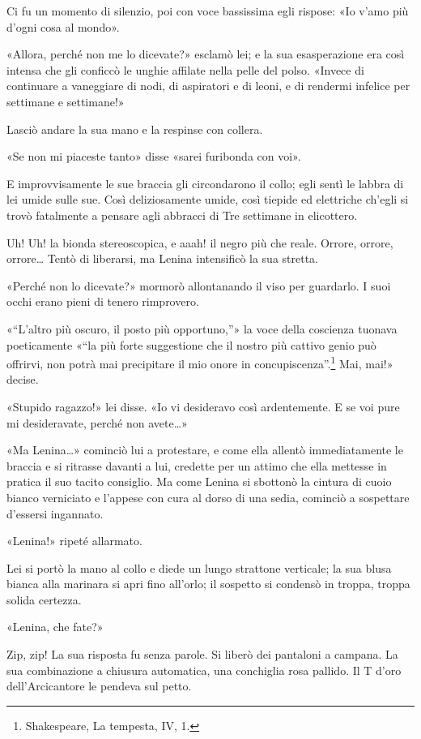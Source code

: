 \documentclass[
a5paper, %
10pt, %
twoside, 
onecolumn, %
openany, %
]{memoir}
\begin{document}
Ci fu un momento di silenzio, poi con voce bassissima egli rispose: «Io v’amo più d’ogni cosa al mondo».

«Allora, perché non me lo dicevate?» esclamò lei; e la sua esasperazione era così intensa che gli conficcò le unghie affilate nella pelle del polso. «Invece di continuare a vaneggiare di nodi, di aspiratori e di leoni, e di rendermi infelice per settimane e settimane!»

Lasciò andare la sua mano e la respinse con collera.

«Se non mi piaceste tanto» disse «sarei furibonda con voi».

E improvvisamente le sue braccia gli circondarono il collo; egli sentì le labbra di lei umide sulle sue. Così deliziosamente umide, così tiepide ed elettriche ch’egli si trovò fatalmente a pensare agli abbracci di Tre settimane in elicottero.

Uh! Uh! la bionda stereoscopica, e aaah! il negro più che reale. Orrore, orrore, orrore… Tentò di liberarsi, ma Lenina intensificò la sua stretta.

«Perché non lo dicevate?» mormorò allontanando il viso per guardarlo. I suoi occhi erano pieni di tenero rimprovero.

«“L’altro più oscuro, il posto più opportuno,”» la voce della coscienza tuonava poeticamente «“la più forte suggestione che il nostro più cattivo genio può offrirvi, non potrà mai precipitare il mio onore in concupiscenza”.\footnote{Shakespeare, La tempesta, IV, 1.} Mai, mai!» decise.

«Stupido ragazzo!» lei disse. «Io vi desideravo così ardentemente. E se voi pure mi desideravate, perché non avete…»

«Ma Lenina…» cominciò lui a protestare, e come ella allentò immediatamente le braccia e si ritrasse davanti a lui, credette per un attimo che ella mettesse in pratica il suo tacito consiglio. Ma come Lenina si sbottonò la cintura di cuoio bianco verniciato e l’appese con cura al dorso di una sedia, cominciò a sospettare d’essersi ingannato.

«Lenina!» ripeté allarmato.

Lei si portò la mano al collo e diede un lungo strattone verticale; la sua blusa bianca alla marinara si apri fino all’orlo; il sospetto si condensò in troppa, troppa solida certezza.

«Lenina, che fate?»

Zip, zip! La sua risposta fu senza parole. Si liberò dei pantaloni a campana. La sua combinazione a chiusura automatica, una conchiglia rosa pallido. Il T d’oro dell’Arcicantore le pendeva sul petto.
\end{document}
